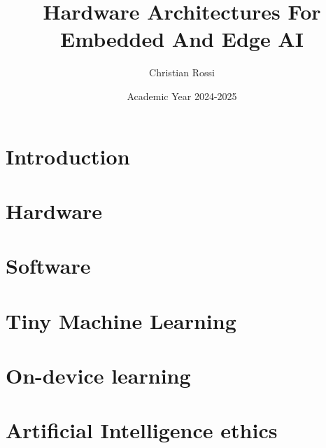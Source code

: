 \documentclass[12pt, a4paper]{report}
\title{\textbf{Hardware Architectures For Embedded And Edge AI}}
\author{Christian Rossi}
\date{Academic Year 2024-2025}
\begin{document}
    \maketitle

    

    \cleardoublepage

    \tableofcontents

    \cleardoublepage

    \chapter{Introduction}
    
    

    \chapter{Hardware}
    
    
    
    

    \chapter{Software}
    
    
    

    \chapter{Tiny Machine Learning}
    
    
    
    
    

    \chapter{On-device learning}
    
    

    \chapter{Artificial Intelligence ethics}
    
    
    
\end{document}
